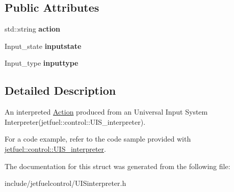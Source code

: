 \subsection*{Public Attributes}
\begin{DoxyCompactItemize}
\item 
\mbox{\label{structjetfuel_1_1control_1_1Action_adb7c74c79316332833660dc60906184c}} 
std\+::string {\bfseries action}
\item 
\mbox{\label{structjetfuel_1_1control_1_1Action_a20d92b3f8f736097e2688df915602cc8}} 
Input\+\_\+state {\bfseries inputstate}
\item 
\mbox{\label{structjetfuel_1_1control_1_1Action_a948114eb27a949423e311103ace134b1}} 
Input\+\_\+type {\bfseries inputtype}
\end{DoxyCompactItemize}


\subsection{Detailed Description}
An interpreted \hyperlink{structjetfuel_1_1control_1_1Action}{Action} produced from an Universal Input System Interpreter(jetfuel\+::control\+::\+U\+I\+S\+\_\+interpreter).

For a code example, refer to the code sample provided with \hyperlink{classjetfuel_1_1control_1_1UIS__interpreter}{jetfuel\+::control\+::\+U\+I\+S\+\_\+interpreter}. 

The documentation for this struct was generated from the following file\+:\begin{DoxyCompactItemize}
\item 
include/jetfuelcontrol/U\+I\+Sinterpreter.\+h\end{DoxyCompactItemize}
